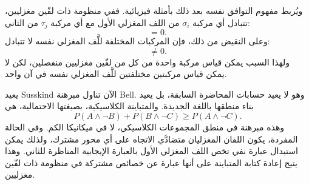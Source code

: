 ويُربط مفهوم التوافق نفسه بعد ذلك بأمثلة فيزيائية. ففي منظومة ذات لفّين مغزليين، تتبادل أي مركبة \(\sigma_i\) من اللف المغزلي الأول مع أي مركبة \(\tau_j\) من الثاني:
\begin{equation}
[\sigma_i,\tau_j]=0.
\end{equation}
وعلى النقيض من ذلك، فإن المركبات المختلفة للَّف المغزلي نفسه لا تتبادل:
\begin{equation}
[\sigma_1,\sigma_3]\neq 0.
\end{equation}
ولهذا السبب يمكن قياس مركبة واحدة من كل من لفّين مغزليين منفصلين، لكن لا يمكن قياس مركبتين مختلفتين للَّف المغزلي نفسه في آن واحد.

\begin{classroomqa}
\end{classroomqa}

\begin{classroomqa}
\end{classroomqa}

\begin{classroomqa}
\end{classroomqa}

يعيد Susskind الآن تناول مبرهنة Bell. وهو لا يعيد حسابات المحاضرة السابقة، بل يعيد بناء منطقها باللغة الجديدة. والمتباينة الكلاسيكية، بصيغتها الاحتمالية، هي
\begin{equation}
P(A\wedge \neg B)+P(B\wedge \neg C)\ge P(A\wedge \neg C).
\end{equation}
وهذه مبرهنة في منطق المجموعات الكلاسيكي، لا في ميكانيكا الكم. وفي الحالة المفردة، يكون اللفان المغزليان متضادَّي الاتجاه على أي محور مشترك، ولذلك يمكن استبدال عبارة نفي تخص اللف المغزلي الأول بالعبارة الإيجابية المناظرة للثاني. وهذا يتيح إعادة كتابة المتباينة على أنها عبارة عن خصائص مشتركة في منظومة ذات لفّين مغزليين.

